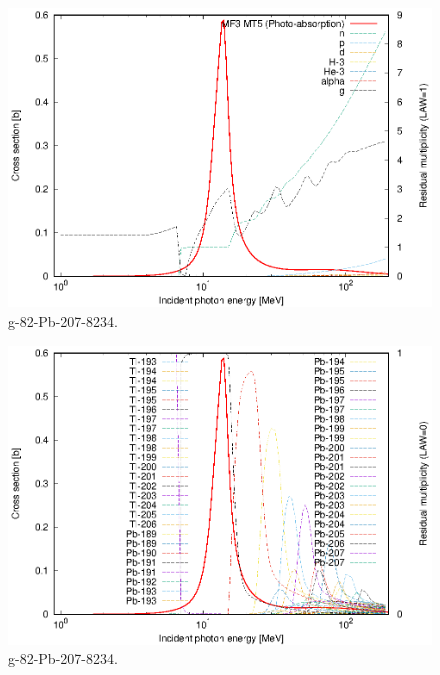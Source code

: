 \begin{figure}
 \includegraphics[width=\linewidth]{eps/g_82-Pb-207_8234.eps}
  \caption{g-82-Pb-207-8234.}
\end{figure}
\begin{figure}
 \includegraphics[width=\linewidth]{eps-law0/g_82-Pb-207_8234.eps}
 \caption{g-82-Pb-207-8234.}
\end{figure}
\newpage \clearpage

